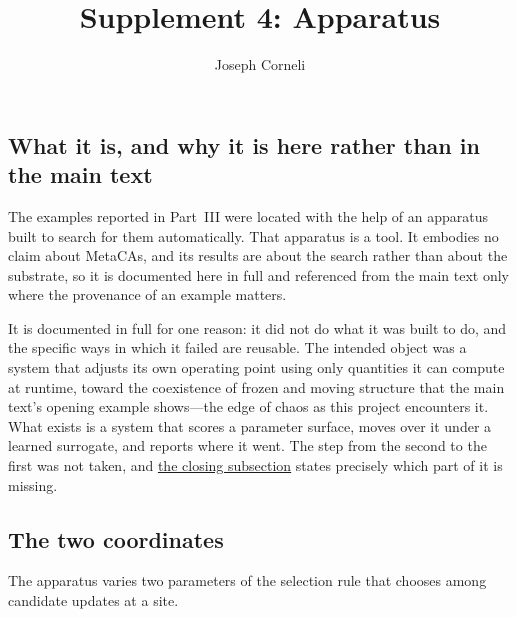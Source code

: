 \documentclass[man,12pt,floatsintext,donotrepeattitle]{apa7}
\title{Supplement 4: Apparatus}
\author{Joseph Corneli}
\affiliation{}
\begin{document}
\maketitle

%
%

\label{supp:miner}

\subsection*{What it is, and why it is here rather than in the main text}

The examples reported in Part~III were located with the help of an apparatus
built to search for them automatically. That apparatus is a tool. It embodies no
claim about MetaCAs, and its results are about the search rather than about the
substrate, so it is documented here in full and referenced from the main text
only where the provenance of an example matters.

It is documented in full for one reason: it did not do what it was built to do,
and the specific ways in which it failed are reusable. The intended object was a
system that adjusts its own operating point using only quantities it can compute at
runtime, toward the coexistence of frozen and moving structure that the main text's
opening example shows---the edge of chaos as this project encounters it. What exists is a system that scores a
parameter surface, moves over it under a learned surrogate, and reports where it
went. The step from the second to the first was not taken, and
\hyperref[supp:miner-negative]{the closing subsection} states precisely which
part of it is missing.

\subsection*{The two coordinates}

The apparatus varies two parameters of the selection rule that chooses among
candidate updates at a site.
\end{document}
